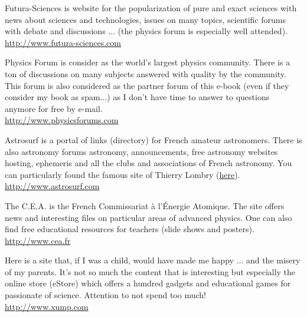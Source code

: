 	{\Large {}}{\Large {}}{\Large {}}{\Large {}}{\Large {}}\bcdfrance{} Futura-Sciences is website for the popularization of pure and exact sciences with news about sciences and technologies, issues on many topics, scientific forums with debate and discussions ... (the physics forum is especially well attended).\\
	\href{http://www.futura-sciences.com}{\color{blue}http://www.futura-sciences.com}
	
	{\Large {}}{\Large {}}{\Large {}}{\Large {}}{\Large {}}\bcdfrance{} Physics Forum is consider as the world's largest physics community. There is a ton of discussions on many subjects answered with quality by the community. This forum is also considered as the partner forum of this e-book (even if they consider my book as spam...) as I don't have time to answer to questions anymore for free by e-mail. \\
	\href{http://www.physicsforums.com}{\color{blue}http://www.physicsforums.com}
	
	{\Large {}}{\Large {}}{\Large {}}{\Large {}}{\Large {}}{\Large {}}{\Large {}}{\Large {}}\bcdfrance{} Astrosurf is a portal of links (directory) for French amateur astronomers. There is also astronomy forums astronomy, announcements, free astronomy websites hosting, ephemeris and all the clubs and associations of French astronomy. You can particularly found the famous site of Thierry Lombry (\href{http://astrosurf.com/luxorion/}{\color{blue}here}).\\
	\href{http://www.astrosurf.com}{\color{blue}http://www.astrosurf.com}
	
	{\Large {}}{\Large {}}\bcdfrance{} The C.E.A. is the French Commissariat à l'Énergie Atomique. The site offers news and interesting files on particular areas of advanced physics. One can also find free educational resources for teachers (slide shows and posters).\\
	\href{http://www.cea.fr}{\color{blue}http://www.cea.fr}
	
	{\Large {}}{\Large {}} Here is a site that, if I was a child, would have made me happy ... and the misery of my parents. It's not so much the content that is interesting but especially the online store (eStore) which offers a hundred gadgets and educational games for passionate of science. Attention to not spend too much!\\
	\href{http://www.xump.com}{\color{blue}http://www.xump.com}
	
